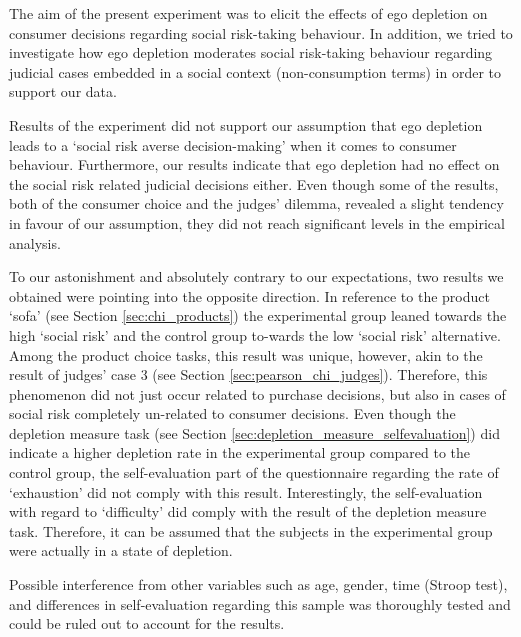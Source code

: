 \onehalfspacing
The aim of the present experiment was to elicit the effects of ego depletion on consumer decisions regarding social risk-taking behaviour. In addition, we tried to investigate how ego depletion moderates social risk-taking behaviour regarding judicial cases embedded in a social context (non-consumption terms) in order to support our data. \par
Results of the experiment did not support our assumption that ego depletion leads to a ‘social risk averse decision-making’ when it comes to consumer behaviour. Furthermore, our results indicate that ego depletion had no effect on the social risk related judicial decisions either. Even though some of the results, both of the consumer choice and the judges’ dilemma, revealed a slight tendency in favour of our assumption, they did not reach significant levels in the empirical analysis. \par
To our astonishment and absolutely contrary to our expectations, two results we obtained were pointing into the opposite direction. In reference to the product ‘sofa’ (see Section \ref{sec:chi_products}) the experimental group leaned towards the high ‘social risk’ and the control group to-wards the low ‘social risk’ alternative. Among the product choice tasks, this result was unique, however, akin to the result of judges’ case 3 (see Section \ref{sec:pearson_chi_judges}). Therefore, this phenomenon did not just occur related to purchase decisions, but also in cases of social risk completely un-related to consumer decisions. Even though the depletion measure task (see Section \ref{sec:depletion_measure_selfevaluation}) did indicate a higher depletion rate in the experimental group compared to the control group, the self-evaluation part of the questionnaire regarding the rate of ‘exhaustion’ did not comply with this result. Interestingly, the self-evaluation with regard to ‘difficulty’ did comply with the result of the depletion measure task. Therefore, it can be assumed that the subjects in the experimental group were actually in a state of depletion.\par
Possible interference from other variables such as age, gender, time (Stroop test), and differences in self-evaluation regarding this sample was thoroughly tested and could be ruled out to account for the results. \par
